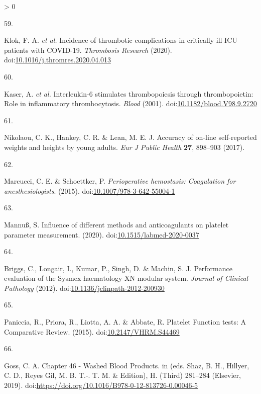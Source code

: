 \documentclass[11pt,twoside]{bristolthesis}
\newlength{\cslhangindent}
\newlength{\csllabelwidth}
\newenvironment{CSLReferences}[2] %
 {%
  \setlength{\parindent}{0pt}
  \ifodd #1 \everypar{\setlength{\hangindent}{\cslhangindent}}\ignorespaces\fi
  \ifnum #2 > 0
  \setlength{\parskip}{#2\baselineskip}
  \fi
 }%
 {}
\newcommand{\CSLLeftMargin}[1]{\parbox[t]{\csllabelwidth}{#1}}
\newcommand{\CSLRightInline}[1]{\parbox[t]{\linewidth - \csllabelwidth}{#1}\break}
\begin{document}
\begin{CSLReferences}{0}{0}
\leavevmode\hypertarget{ref-Klok2020}{}%
\CSLLeftMargin{59. }
\CSLRightInline{Klok, F. A. \emph{et al.} {Incidence of thrombotic complications in critically ill ICU patients with COVID-19}. \emph{Thrombosis Research} (2020). doi:\href{https://doi.org/10.1016/j.thromres.2020.04.013}{10.1016/j.thromres.2020.04.013}}

\leavevmode\hypertarget{ref-Kaser2001}{}%
\CSLLeftMargin{60. }
\CSLRightInline{Kaser, A. \emph{et al.} {Interleukin-6 stimulates thrombopoiesis through thrombopoietin: Role in inflammatory thrombocytosis}. \emph{Blood} (2001). doi:\href{https://doi.org/10.1182/blood.V98.9.2720}{10.1182/blood.V98.9.2720}}

\leavevmode\hypertarget{ref-Nikolaou2017}{}%
\CSLLeftMargin{61. }
\CSLRightInline{Nikolaou, C. K., Hankey, C. R. \& Lean, M. E. J. {Accuracy of on-line self-reported weights and heights by young adults}. \emph{Eur J Public Health} \textbf{27}, 898--903 (2017).}

\leavevmode\hypertarget{ref-Marcucci2015}{}%
\CSLLeftMargin{62. }
\CSLRightInline{Marcucci, C. E. \& Schoettker, P. \emph{{Perioperative hemostasis: Coagulation for anesthesiologists}}. (2015). doi:\href{https://doi.org/10.1007/978-3-642-55004-1}{10.1007/978-3-642-55004-1}}

\leavevmode\hypertarget{ref-Mannuuxdf2020}{}%
\CSLLeftMargin{63. }
\CSLRightInline{Mannuß, S. {Influence of different methods and anticoagulants on platelet parameter measurement}. (2020). doi:\href{https://doi.org/10.1515/labmed-2020-0037}{10.1515/labmed-2020-0037}}

\leavevmode\hypertarget{ref-Briggs2012}{}%
\CSLLeftMargin{64. }
\CSLRightInline{Briggs, C., Longair, I., Kumar, P., Singh, D. \& Machin, S. J. {Performance evaluation of the Sysmex haematology XN modular system}. \emph{Journal of Clinical Pathology} (2012). doi:\href{https://doi.org/10.1136/jclinpath-2012-200930}{10.1136/jclinpath-2012-200930}}

\leavevmode\hypertarget{ref-Paniccia2015}{}%
\CSLLeftMargin{65. }
\CSLRightInline{Paniccia, R., Priora, R., Liotta, A. A. \& Abbate, R. {Platelet Function tests: A Comparative Review}. (2015). doi:\href{https://doi.org/10.2147/VHRM.S44469}{10.2147/VHRM.S44469}}

\leavevmode\hypertarget{ref-Goss2019}{}%
\CSLLeftMargin{66. }
\CSLRightInline{Goss, C. A. {Chapter 46 - Washed Blood Products}. in (eds. Shaz, B. H., Hillyer, C. D., Reyes Gil, M. B. T.-. T. M. \& Edition), H. (Third) 281--284 (Elsevier, 2019). doi:\url{https://doi.org/10.1016/B978-0-12-813726-0.00046-5}}


\end{CSLReferences}
\end{document}
